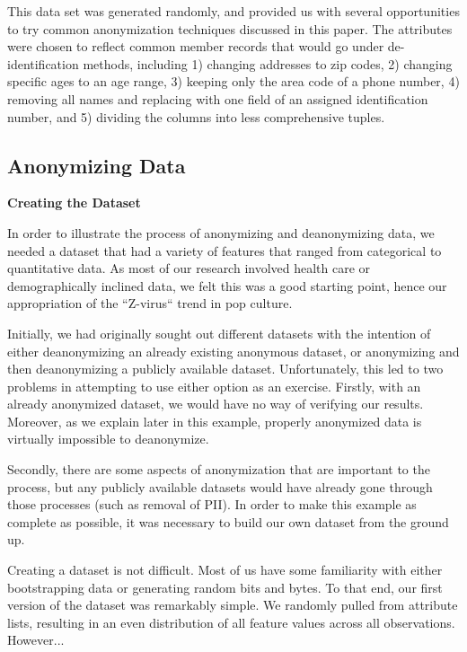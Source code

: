 \documentclass[10pt,journal,compsoc]{IEEEtran}
\begin{document}
This data set was generated randomly, and provided us with several opportunities to try common anonymization techniques discussed in this paper.  The attributes were chosen to reflect common member records that would go under de-identification methods, including 1) changing addresses to zip codes, 2) changing specific ages to an age range, 3) keeping only the area code of a phone number, 4) removing all names and replacing with one field of an assigned identification number, and 5) dividing the columns into less comprehensive tuples.


\subsection{Anonymizing Data}

\noindent \textbf{Creating the Dataset}

In order to illustrate the process of anonymizing and deanonymizing data, we needed a dataset that had a variety of features that ranged from categorical to quantitative data. As most of our research involved health care or demographically inclined data, we felt this was a good starting point, hence our appropriation of the ``Z-virus`` trend in pop culture.

Initially, we had originally sought out different datasets with the intention of either deanonymizing an already existing anonymous dataset, or anonymizing and then deanonymizing a publicly available dataset. Unfortunately, this led to two problems in attempting to use either option as an exercise. Firstly, with an already anonymized dataset, we would have no way of verifying our results. Moreover, as we explain later in this example, properly anonymized data is virtually impossible to deanonymize. 

Secondly, there are some aspects of anonymization that are important to the process, but any publicly available datasets would have already gone through those processes (such as removal of PII). In order to make this example as complete as possible, it was necessary to build our own dataset from the ground up.

Creating a dataset is not difficult. Most of us have some familiarity with either bootstrapping data or generating random bits and bytes. To that end, our first version of the dataset was remarkably simple. We randomly pulled from attribute lists, resulting in an even distribution of all feature values across all observations.  However...
\end{document}
